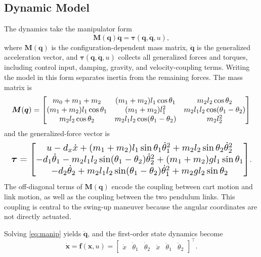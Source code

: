 \documentclass[conference]{IEEEtran}
\begin{document}
\subsection{Dynamic Model}
The dynamics take the manipulator form
\begin{equation}
\bm{M}(\bm{q}) \ddot{\bm{q}} = \bm{\tau}(\bm{q},\dot{\bm{q}},u),
\label{eq:manip}
\end{equation}
where $\bm{M}(\bm{q})$ is the configuration-dependent mass matrix, $\ddot{\bm{q}}$ is the generalized acceleration vector, and $\bm{\tau}(\bm{q},\dot{\bm{q}},u)$ collects all generalized forces and torques, including control input, damping, gravity, and velocity-coupling terms. Writing the model in this form separates inertia from the remaining forces. The mass matrix is
\begin{equation}
\resizebox{0.98\columnwidth}{!}{$
\displaystyle
\bm{M}(\bm{q}) =
\begin{bmatrix}
m_0 + m_1 + m_2 & (m_1+m_2)l_1\cos\theta_1 & m_2l_2\cos\theta_2 \\
(m_1+m_2)l_1\cos\theta_1 & (m_1+m_2)l_1^2 & m_2l_1l_2\cos(\theta_1-\theta_2) \\
m_2l_2\cos\theta_2 & m_2l_1l_2\cos(\theta_1-\theta_2) & m_2l_2^2
\end{bmatrix}
$}
\end{equation}
and the generalized-force vector is
\begin{equation}
\resizebox{0.98\columnwidth}{!}{$
\displaystyle
\bm{\tau} =
\begin{bmatrix}
u - d_x \dot{x} + (m_1+m_2)l_1\sin\theta_1 \dot{\theta}_1^2 + m_2l_2\sin\theta_2 \dot{\theta}_2^2 \\
-d_1 \dot{\theta}_1 - m_2l_1l_2\sin(\theta_1-\theta_2)\dot{\theta}_2^2 + (m_1+m_2)gl_1\sin\theta_1 \\
-d_2 \dot{\theta}_2 + m_2l_1l_2\sin(\theta_1-\theta_2)\dot{\theta}_1^2 + m_2gl_2\sin\theta_2
\end{bmatrix}
$}.
\end{equation}
The off-diagonal terms of $\bm{M}(\bm{q})$ encode the coupling between cart motion and link motion, as well as the coupling between the two pendulum links. This coupling is central to the swing-up maneuver because the angular coordinates are not directly actuated.

Solving \eqref{eq:manip} yields $\ddot{\bm{q}}$, and the first-order state dynamics become
\begin{equation}
\dot{\bm{x}} = \bm{f}(\bm{x},u)
=
\begin{bmatrix}
\dot{x} & \dot{\theta}_1 & \dot{\theta}_2 & \ddot{x} & \ddot{\theta}_1 & \ddot{\theta}_2
\end{bmatrix}^\top.
\end{equation}
\end{document}
